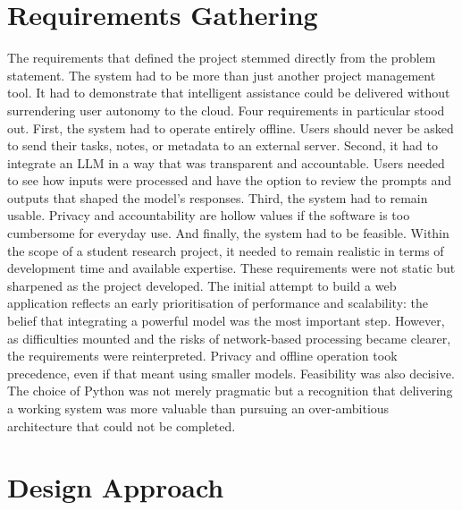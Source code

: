 \documentclass{report}
\begin{document}
\section{Requirements Gathering}

The requirements that defined the project stemmed directly from the problem statement. The system had to be more than just another project management tool. It had to demonstrate that intelligent assistance could be delivered without surrendering user autonomy to the cloud. Four requirements in particular stood out.
First, the system had to operate entirely offline. Users should never be asked to send their tasks, notes, or metadata to an external server. Second, it had to integrate an LLM in a way that was transparent and accountable. Users needed to see how inputs were processed and have the option to review the prompts and outputs that shaped the model's responses. Third, the system had to remain usable. Privacy and accountability are hollow values if the software is too cumbersome for everyday use. And finally, the system had to be feasible. Within the scope of a student research project, it needed to remain realistic in terms of development time and available expertise.
These requirements were not static but sharpened as the project developed. The initial attempt to build a web application reflects an early prioritisation of performance and scalability: the belief that integrating a powerful model was the most important step. However, as difficulties mounted and the risks of network-based processing became clearer, the requirements were reinterpreted. Privacy and offline operation took precedence, even if that meant using smaller models. Feasibility was also decisive. The choice of Python was not merely pragmatic but a recognition that delivering a working system was more valuable than pursuing an over-ambitious architecture that could not be completed.

\section{Design Approach}
\end{document}
